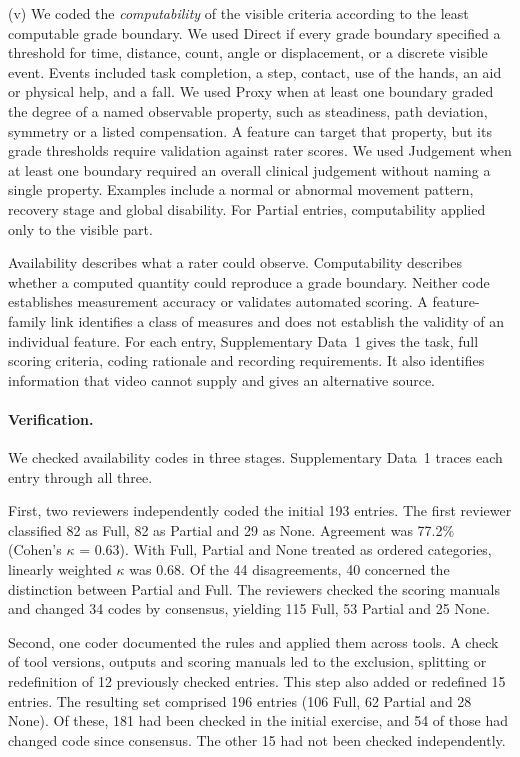 \documentclass[11pt]{article}
\begin{document}
(v) We coded the \emph{computability} of the visible criteria according to the least computable grade boundary. We used Direct if every grade boundary specified a threshold for time, distance, count, angle or displacement, or a discrete visible event. Events included task completion, a step, contact, use of the hands, an aid or physical help, and a fall. We used Proxy when at least one boundary graded the degree of a named observable property, such as steadiness, path deviation, symmetry or a listed compensation. A feature can target that property, but its grade thresholds require validation against rater scores. We used Judgement when at least one boundary required an overall clinical judgement without naming a single property. Examples include a normal or abnormal movement pattern, recovery stage and global disability. For Partial entries, computability applied only to the visible part.

Availability describes what a rater could observe. Computability describes whether a computed quantity could reproduce a grade boundary. Neither code establishes measurement accuracy or validates automated scoring. A feature-family link identifies a class of measures and does not establish the validity of an individual feature. For each entry, Supplementary Data~1 gives the task, full scoring criteria, coding rationale and recording requirements. It also identifies information that video cannot supply and gives an alternative source.

\paragraph{Verification.} We checked availability codes in three stages. Supplementary Data~1 traces each entry through all three.

First, two reviewers independently coded the initial 193 entries. The first reviewer classified 82 as Full, 82 as Partial and 29 as None. Agreement was 77.2\% (Cohen's $\kappa$ = 0.63). With Full, Partial and None treated as ordered categories, linearly weighted $\kappa$ was 0.68. Of the 44 disagreements, 40 concerned the distinction between Partial and Full. The reviewers checked the scoring manuals and changed 34 codes by consensus, yielding 115 Full, 53 Partial and 25 None.

Second, one coder documented the rules and applied them across tools. A check of tool versions, outputs and scoring manuals led to the exclusion, splitting or redefinition of 12 previously checked entries. This step also added or redefined 15 entries. The resulting set comprised 196 entries (106 Full, 62 Partial and 28 None). Of these, 181 had been checked in the initial exercise, and 54 of those had changed code since consensus. The other 15 had not been checked independently.
\end{document}
